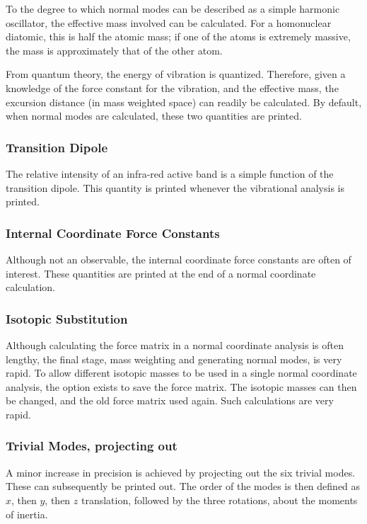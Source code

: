 To the degree to which normal modes can be described as a simple harmonic
oscillator, the effective mass involved can be calculated.  For a homonuclear
diatomic, this is half the atomic mass; if one of the atoms is extremely
massive,  the mass is approximately that of the other atom.

From quantum theory, the energy of vibration is quantized.  Therefore, given a
knowledge of the force constant for the vibration, and the effective mass, the
excursion distance (in mass weighted space) can readily be calculated.  By
default, when normal modes are calculated, these two quantities are printed.

\subsubsection*{Transition Dipole}

The relative intensity of an infra-red active band is a simple function of the
transition dipole.  This quantity is printed whenever the vibrational analysis
is  printed.

\subsubsection*{Internal Coordinate Force Constants}

Although not an observable, the internal coordinate force constants are often
of  interest.  These quantities are printed at the end of a normal coordinate
calculation.

\subsubsection*{Isotopic Substitution}

Although calculating the force matrix in a normal coordinate analysis is often
lengthy, the final stage, mass weighting and generating normal modes, is very
rapid.  To allow different isotopic masses to be used in a single normal
coordinate analysis, the option exists to save the force matrix.  The isotopic
masses can then be changed, and the old force matrix used again.  Such
calculations are very rapid.

\subsubsection*{Trivial Modes, projecting out}

A minor increase in precision is achieved by projecting out the six trivial
modes.   These can subsequently be printed out.  The order of the modes is then
defined  as $x$, then $y$, then $z$ translation, followed by the three
rotations, about the moments  of inertia.

